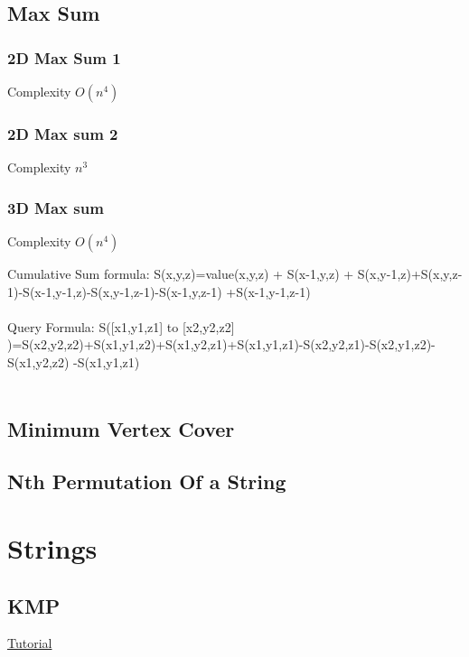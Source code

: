\documentclass[11pt]{report}
\begin{document}
\section{Max Sum}
\subsection{2D Max Sum 1}
Complexity $O(n^4)$

\subsection{2D Max sum 2}
Complexity $n^3$

\subsection{3D Max sum}
Complexity $O(n^4)$

Cumulative Sum formula: S(x,y,z)=value(x,y,z) + S(x-1,y,z) + S(x,y-1,z)+S(x,y,z-1)-S(x-1,y-1,z)-S(x,y-1,z-1)-S(x-1,y,z-1)
+S(x-1,y-1,z-1)\\ \\
Query Formula: S([x1,y1,z1] to [x2,y2,z2] )=S(x2,y2,z2)+S(x1,y1,z2)+S(x1,y2,z1)+S(x1,y1,z1)-S(x2,y2,z1)-S(x2,y1,z2)-S(x1,y2,z2)
-S(x1,y1,z1) \\ \\ 



\section{Minimum Vertex Cover}

\newpage
\section{Nth Permutation Of a String}


\chapter{Strings}
\section{KMP}
\href{https://tanvir002700.wordpress.com/2015/03/03/kmp-knuth-morris-pratt-algorithm/}{Tutorial}

\end{document}
